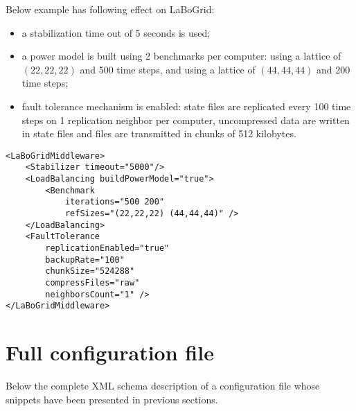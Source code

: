 Below example has following effect on LaBoGrid:

\begin{itemize}
	\item a stabilization time out of 5 seconds is used;
	\item a power model is built using 2 benchmarks per computer: using a lattice
	of $(22,22,22)$ and 500 time steps, and using a lattice of $(44,44,44)$ and 200
	time steps;
	\item fault tolerance mechanism is enabled: state files are replicated every
	100 time steps on 1 replication neighbor per computer, uncompressed data are
	written in state files and files are transmitted in chunks of 512 kilobytes.
\end{itemize}

\begin{Verbatim}[tabsize=2,frame=lines]
<LaBoGridMiddleware>
	<Stabilizer timeout="5000"/>
	<LoadBalancing buildPowerModel="true">
		<Benchmark
			iterations="500 200"
			refSizes="(22,22,22) (44,44,44)" />
	</LoadBalancing>
	<FaultTolerance
		replicationEnabled="true"
		backupRate="100"
		chunkSize="524288"
		compressFiles="raw"
		neighborsCount="1" />
</LaBoGridMiddleware>
\end{Verbatim}


\section{Full configuration file}

Below the complete XML schema description of a configuration file whose snippets
have been presented in previous sections.

